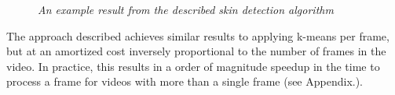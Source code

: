 \begin{figure}[H]
    \centering
    \qquad

    \qquad
   \caption{\textit{An example result from the described skin detection algorithm} }
\end{figure}
\noindent
The approach described achieves similar results to applying k-means per frame, but at an amortized cost 
inversely proportional to the number of frames in the video. In practice, this results in a order of magnitude speedup in the time to process a frame
for videos with more than a single frame (see Appendix.).


